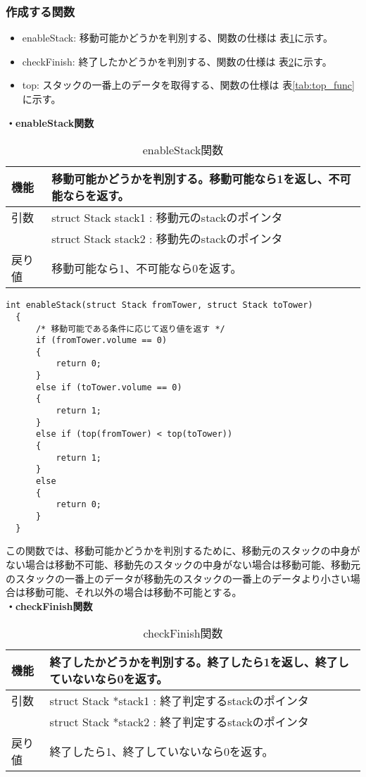 \documentclass[dvipdfmx]{jsarticle}
\begin{document}
\subsubsection{作成する関数}
\begin{itemize}
  \item enableStack: 移動可能かどうかを判別する、関数の仕様は 表\ref{tab:enablestack_func}に示す。
  \item checkFinish: 終了したかどうかを判別する、関数の仕様は 表\ref{tab:checkfinish_func}に示す。
  \item top: スタックの一番上のデータを取得する、関数の仕様は 表\ref{tab:top_func}に示す。
\end{itemize}
\textbf{・enableStack関数}
\begin{table}[ht]
  \centering
  \caption{enableStack関数}
  \begin{tabular}{|p{5cm}|p{10cm}|}
    \hline
    機能  & 移動可能かどうかを判別する。移動可能なら1を返し、不可能ならを返す。   \\
    \hline
    引数  & struct Stack stack1 : 移動元のstackのポインタ \\
        & struct Stack stack2 : 移動先のstackのポインタ \\
    \hline
    戻り値 & 移動可能なら1、不可能なら0を返す。                   \\
    \hline
  \end{tabular}
  \label{tab:enablestack_func}
\end{table}
\begin{lstlisting}[caption={enableStack関数}, label={lst:enablestack_func}]
  int enableStack(struct Stack fromTower, struct Stack toTower)
  {
      /* 移動可能である条件に応じて返り値を返す */
      if (fromTower.volume == 0)
      {
          return 0;
      }
      else if (toTower.volume == 0)
      {
          return 1;
      }
      else if (top(fromTower) < top(toTower))
      {
          return 1;
      }
      else
      {
          return 0;
      }
  }
\end{lstlisting}
この関数では、移動可能かどうかを判別するために、移動元のスタックの中身がない場合は移動不可能、移動先のスタックの中身がない場合は移動可能、移動元のスタックの一番上のデータが移動先のスタックの一番上のデータより小さい場合は移動可能、それ以外の場合は移動不可能とする。
\\
\textbf{・checkFinish関数}
\begin{table}[ht]
  \centering
  \caption{checkFinish関数}
  \begin{tabular}{|p{5cm}|p{10cm}|}
    \hline
    機能  & 終了したかどうかを判別する。終了したら1を返し、終了していないなら0を返す。  \\
    \hline
    引数  & struct Stack *stack1 : 終了判定するstackのポインタ \\
        & struct Stack *stack2 : 終了判定するstackのポインタ \\
    \hline
    戻り値 & 終了したら1、終了していないなら0を返す。                   \\
    \hline
  \end{tabular}
  \label{tab:checkfinish_func}
\end{table}
\end{document}
